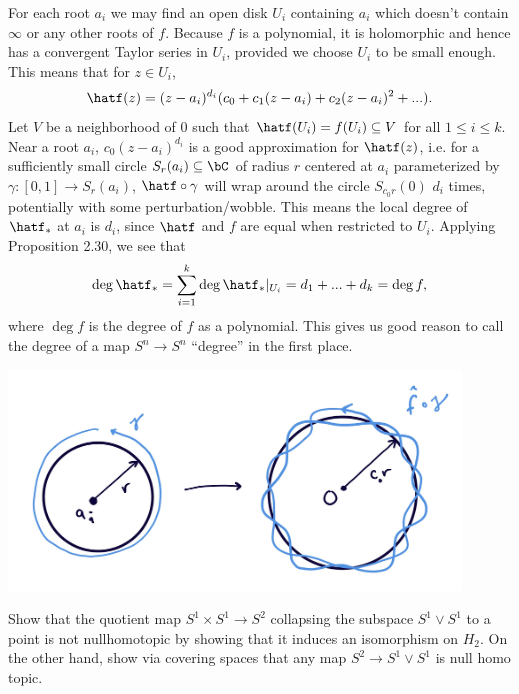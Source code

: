 \begin{homework}[e]
\begin{prf}
    For each root $a_i$ we may find an open disk $U_i$ containing $a_i$ which doesn't contain $\infty$ or any other roots of $f$. Because $f$ is a polynomial, it is holomorphic and hence has a convergent Taylor series in $U_i$, provided we choose $U_i$ to be small enough. This means that for $z \in U_i$,
    \begin{align*}
      \hatf(z) = (z - a_i)^{d_i}(c_0 + c_1(z-a_i) + c_2(z-a_i)^2+...).
    \end{align*}
    Let $V$ be a neighborhood of $0$ such that $\hatf(U_i) = f(U_i) \subseteq V$ for all $1\leq i\leq k$. Near a root $a_i$, $c_0(z - a_i)^{d_i}$ is a good approximation for $\hatf(z)$, i.e. for a sufficiently small circle $S_r(a_i)\subseteq \bC$ of radius $r$ centered at $a_i$ parameterized by $\gamma:[0,1]\to S_r(a_i)$, $\hatf\circ \gamma$ will wrap around the circle $S_{c_0r}(0)$ $d_i$ times, potentially with some perturbation/wobble. This means the local degree of $\hatf_*$ at $a_i$ is $d_i$, since $\hatf$ and $f$ are equal when restricted to $U_i$. Applying Proposition 2.30, we see that
    \begin{align*}
      \deg \hatf_* = \sum_{i=1}^k \deg \hatf_*|_{U_i} = d_1 + ... + d_k = \deg f,
    \end{align*}
    where $\deg f$ is the degree of $f$ as a polynomial. This gives us good reason to call the degree of a map $S^n \to S^n$ ``degree'' in the first place.
    \begin{center}
      \includegraphics[width=12cm]{figures/hwk10-fig1.png}
      \label{fig:prob1-1}
    \end{center}
  \end{prf} 
   Show that the quotient map $S^1\times S^1 \to S^2$ collapsing the subspace $S^1 \vee S^1$ to a point is not nullhomotopic by showing that it induces an isomorphism on $H_2$. On the other hand, show via covering spaces that any map $S^2 \to S^1\vee S^1$ is null homo topic.

\end{homework}
